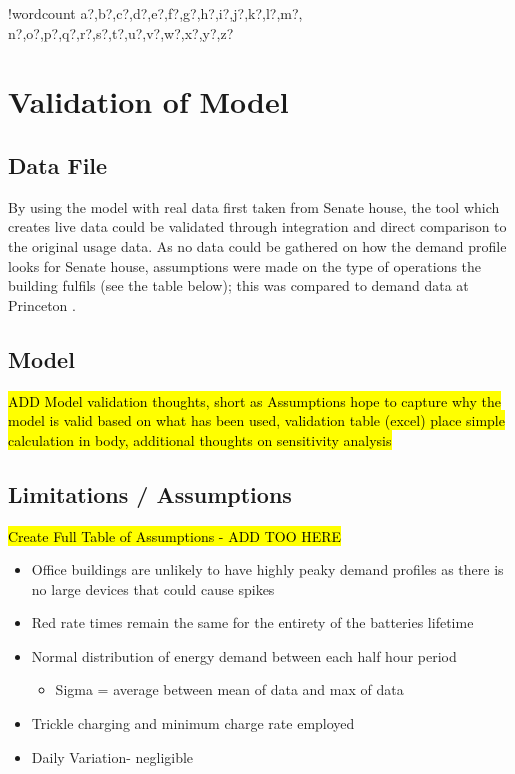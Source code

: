 \documentclass[fontsize=9.5pt]{extarticle}
\numberwithin{figure}{section} %
\providecommand{\tightlist}{%
  \setlength{\itemsep}{0pt}\setlength{\parskip}{0pt}}
\newcounter{words}
\newenvironment{counted}{%
  \setcounter{words}{0}
  \SearchList!{wordcount}{\stepcounter{words}}
    {a?,b?,c?,d?,e?,f?,g?,h?,i?,j?,k?,l?,m?,
    n?,o?,p?,q?,r?,s?,t?,u?,v?,w?,x?,y?,z?}
  \UndoBoundary{'}
  \SearchOrder{p;}}{%
  \StopSearching}
\begin{document}
\begin{counted}
\section{Validation of Model}\label{validation-of-model}

\subsection{Data File}\label{data-file}

By using the model with real data first taken from Senate house, the
tool which creates live data could be validated through integration and
direct comparison to the original usage data. As no data could be
gathered on how the demand profile looks for Senate house, assumptions
were made on the type of operations the building fulfils (see the table
below); this was compared to demand data at Princeton
\autocite{LiveData90:online}.

\subsection{Model}\label{model}

\hl{ADD Model validation thoughts, short as Assumptions hope to capture why the model is valid based on what has been used, validation table (excel) place simple calculation in body, additional thoughts on sensitivity analysis}

\subsection{Limitations / Assumptions}\label{limitations-assumptions}

\hl{Create Full Table of Assumptions - ADD TOO HERE}

\begin{itemize}
\tightlist
\item
  Office buildings are unlikely to have highly peaky demand profiles as
  there is no large devices that could cause spikes
\item
  Red rate times remain the same for the entirety of the batteries
  lifetime
\item
  Normal distribution of energy demand between each half hour period

  \begin{itemize}
  \tightlist
  \item
    Sigma = average between mean of data and max of data
  \end{itemize}
\item
  Trickle charging and minimum charge rate employed
\item
  Daily Variation- negligible


\end{itemize}
\end{counted}
\end{document}

